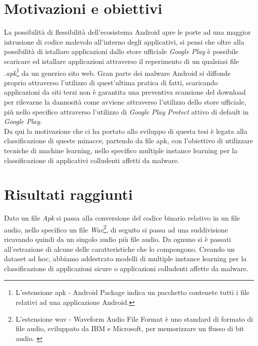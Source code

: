 
\section{Motivazioni e obiettivi}
\label{sec:intro2}
La possibilità di flessibilità dell'ecosistema Android apre le porte ad una maggior intrusione di codice malevolo all'interno degli applicativi, si pensi che oltre alla possibilità di istallare applicazioni dallo store ufficiale \textit{Google Play} è possibile scaricare ed istallare applicazioni attraverso il reperimento di un qualsiasi file \textit{.apk}\footnote{L'estensione apk - Android Package indica un pacchetto contenete tutti i file relativi ad una applicazione Android.} da un generico sito web. Gran parte dei malware Android si diffonde proprio attraverso l'utilizzo di quest'ultima pratica di fatti, scaricando applicazioni da siti terzi non è garantita una preventiva scansione del download per rilevarne la dannosità come avviene attraverso l'utilizzo dello store ufficiale, più nello specifico attraverso l'utilizzo di \textit{Google Play Protect} attivo di default in \textit{Google Play}.
\\Da qui la motivazione che ci ha portato allo sviluppo di questa tesi è legata alla classificazione di queste minacce, partendo da file apk, con l'obiettivo di utilizzare tecniche di machine learning, nello specifico multiple instance learning per la classificazione di applicativi colludenti affetti da malware.



\section{Risultati raggiunti}
\label{sec:intro3}
Dato un file \textit{Apk} si passa alla conversione del codice binario relativo in un file audio, nello specifico un file \textit{Wav}\footnote{L'estensione wav - Waveform Audio File Format è uno standard di formato di file audio, sviluppato da IBM e Microsoft, per memorizzare un flusso di bit audio. \cite{enwiki:1020662001}}, di seguito si passa ad una suddivisione ricavando quindi da un singolo audio più file audio. Da ognuno si è passati all'estrazione di alcune delle caratteristiche che lo compongono. Creando un dataset ad hoc, abbiamo addestrato modelli di multiple instance learning per la classificazione di applicazioni sicure o applicazioni colludenti affette da malware. 


